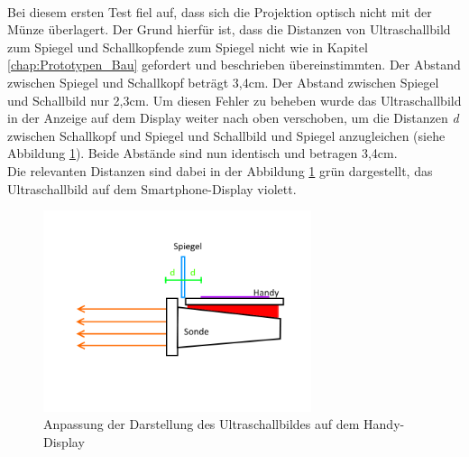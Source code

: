 ~\\
Bei diesem ersten Test fiel auf, dass sich die Projektion optisch nicht mit der Münze überlagert. Der Grund hierfür ist, dass die Distanzen von Ultraschallbild zum Spiegel und Schallkopfende zum Spiegel nicht wie in Kapitel \ref{chap:Prototypen_Bau} gefordert und beschrieben übereinstimmten. Der Abstand zwischen Spiegel und Schallkopf beträgt 3,4cm. Der Abstand zwischen Spiegel und Schallbild nur 2,3cm. Um diesen Fehler zu beheben wurde das Ultraschallbild in der Anzeige auf dem Display weiter nach oben verschoben, um die Distanzen \textit{d} zwischen Schallkopf und Spiegel und Schallbild und Spiegel anzugleichen (siehe Abbildung \ref{fig:Prototyp_Evaluierung}). Beide Abstände sind nun identisch und betragen 3,4cm.
\\
Die relevanten Distanzen sind dabei in der Abbildung \ref{fig:Prototyp_Evaluierung} grün dargestellt, das Ultraschallbild auf dem Smartphone-Display violett.
\clearpage
\begin{figure}[h]
	\centering
	\includegraphics*[width=0.7\textwidth]{Bilder/Evaluation/Prototyp.png}
	\caption{Anpassung der Darstellung des Ultraschallbildes auf dem Handy-Display}
	\label{fig:Prototyp_Evaluierung}
\end{figure}

